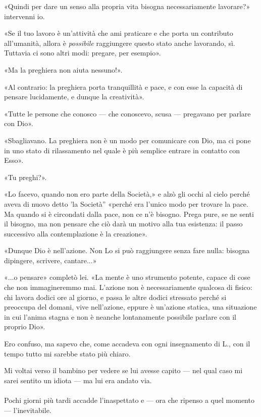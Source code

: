\documentclass[a4paper,12pt]{book}
\begin{document}
«Quindi per dare un senso alla propria vita bisogna necessariamente lavorare?»
intervenni io.

«Se il tuo lavoro è un'attività che ami praticare e che porta un contributo
all'umanità, allora è \emph{possibile} raggiungere questo stato anche lavorando,
sì. Tuttavia ci sono altri modi: pregare, per esempio».

«Ma la preghiera non aiuta nessuno!».

«Al contrario: la preghiera porta tranquillità e pace, e con esse la capacità
di pensare lucidamente, e dunque la creatività».

«Tutte le persone che conosco --- che conoscevo, scusa --- pregavano per parlare
con Dio».

«Sbagliavano. La preghiera non è un modo per comunicare con Dio, ma ci pone in
uno stato di rilassamento nel quale è più semplice entrare in contatto con Esso».

«Tu preghi?».

«Lo facevo, quando non ero parte della Società,» e alzò gli occhi al cielo perché
aveva di nuovo detto 'la Società'' «perché era l'unico modo per trovare la pace.
Ma quando si è circondati dalla pace, non ce n'è bisogno. Prega pure, se ne senti
il bisogno, ma non pensare che ciò darà un motivo alla tua esistenza: il passo
successivo alla contemplazione è la creazione».

«Dunque Dio è nell'azione. Non Lo si può raggiungere senza fare nulla: bisogna
dipingere, scrivere, cantare...»

«...o pensare» completò lei. «La mente è uno strumento potente, capace di cose
che non immagineremmo mai. L'azione non è necessariamente qualcosa di fisico:
chi lavora dodici ore al giorno, e passa le altre dodici stressato perché si
preoccupa del domani, vive nell'azione, eppure è un'azione statica, una
situazione in cui l'anima stagna e non è neanche lontanamente possibile parlare
con il proprio Dio».

Ero confuso, ma sapevo che, come accadeva con ogni insegnamento di L., con il
tempo tutto mi sarebbe stato più chiaro.

Mi voltai verso il bambino per vedere se lui avesse capito --- nel qual caso mi
sarei sentito un idiota --- ma lui era andato via.

\paragraph{}
Pochi giorni più tardi accadde l'inaspettato e --- ora che ripenso a quel
momento --- l'inevitabile.
\end{document}
